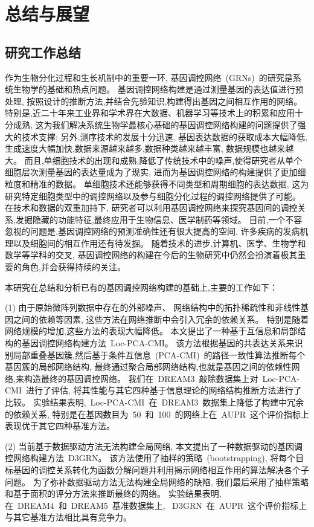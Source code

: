 \section{总结与展望}

\subsection{研究工作总结}

作为生物分化过程和生长机制中的重要一环,
基因调控网络~(GRNs)~的研究是系统生物学的基础和热点问题。
基因调控网络构建是通过测量基因的表达值进行预处理,
按照设计的推断方法,并结合先验知识,构建得出基因之间相互作用的网络。
特别是,近二十年来工业界和学术界在大数据、机器学习等技术上的积累和应用十分成熟,
这为我们解决系统生物学最核心基础的基因调控网络构建的问题提供了强大的技术支撑;
另外,测序技术的发展十分迅速,
基因表达数据的获取成本大幅降低,生成速度大幅加快,数据来源越来越多,数据种类越来越丰富, 数据规模也越来越大。
而且,单细胞技术的出现和成熟,降低了传统技术中的噪声,使得研究者从单个细胞层次测量基因的表达量成为了现实,
进而为基因调控网络的构建提供了更加细粒度和精准的数据。
单细胞技术还能够获得不同类型和周期细胞的表达数据,
这为研究特定细胞类型中的调控网络以及参与细胞分化过程的调控网络提供了可能。
在技术和数据的双重加持下,
研究者可以利用基因调控网络来探究基因间的调控关系,发掘隐藏的功能特征,最终应用于生物信息、医学制药等领域。
目前,一个不容忽视的问题是,基因调控网络的预测准确性还有很大提高的空间,
许多疾病的发病机理以及细胞间的相互作用还有待发掘。
随着技术的进步,计算机、医学、生物学和数学等学科的交叉,
基因调控网络的构建在今后的生物研究中仍然会扮演着极其重要的角色,并会获得持续的关注。

本研究在总结和分析已有的基因调控网络构建的基础上,主要的工作如下：

(1) 由于原始微阵列数据中存在的外部噪声、
网络结构中的拓扑稀疏性和非线性基因之间的依赖等因素,
这些方法在网络推断中会引入冗余的依赖关系。
特别是随着网络规模的增加,这些方法的表现大幅降低。
本文提出了一种基于互信息和局部结构的基因调控网络构建方法~Loc-PCA-CMI。
该方法根据基因的共表达关系来识别局部重叠基因簇,然后基于条件互信息~(PCA-CMI)~的路径一致性算法推断每个基因簇的局部网络结构,
最终通过聚合局部网络结构,也就是基因之间的依赖性网络,来构造最终的基因调控网络。
我们在~DREAM3~敲除数据集上对~Loc-PCA-CMI~进行了评估,
将其性能与其它四种基于信息理论的网络结构推断方法进行了比较。
实验结果表明,~Loc-PCA-CMI~在~DREAM3~数据集上降低了构建中冗余的依赖关系,
特别是在基因数目为~50~和~100~的网络上在~AUPR~这个评价指标上表现优于其它四种基准方法。

(2) 当前基于数据驱动方法无法构建全局网络,
本文提出了一种数据驱动的基因调控网络构建方法~D3GRN。
该方法使用了抽样的策略~(bootstrapping),
将每个目标基因的调控关系转化为函数分解问题并利用揭示网络相互作用的算法解决各个子问题。
为了弥补数据驱动方法无法构建全局网络的缺陷,
我们最后采用了抽样策略和基于面积的评分方法来推断最终的网络。
实验结果表明,在~DREAM4~和~DREAM5~基准数据集上,
~D3GRN~在~AUPR~这个评价指标上与其它基准方法相比具有竞争力。

